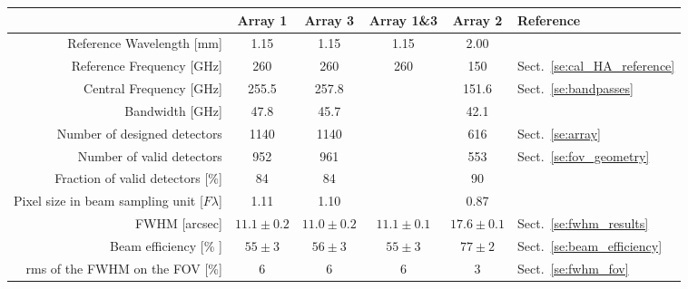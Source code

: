 \begin{table}[h]
\begin{center}    
  \begin{threeparttable}
    \begin{tabular}{|r|c|c|c|c|l|}
      \hline
      & Array 1 & Array 3  & Array 1\&3 & Array 2 & Reference \\
      \hline
      \hline
      Reference Wavelength  [mm]  &  1.15    &  1.15   & 1.15  & 2.00   &   \\
      Reference Frequency  [GHz]  &  260    &  260   & 260  & 150   &  Sect.~\ref{se:cal_HA_reference}  \\
      Central Frequency [GHz]     &  255.5  &  257.8 &      & 151.6 &  Sect.~\ref{se:bandpasses}  \\
      Bandwidth         [GHz]     &  47.8   &  45.7  &      & 42.1  &   \\
      \hline
      Number of designed detectors                   & 1140      &  1140    &    &    616  & Sect.~\ref{se:array}\\
      Number of valid detectors                      &  952      &   961    &    &    553  & Sect.~\ref{se:fov_geometry}\\
      Fraction of valid detectors [$\%$]             &  84       &   84     &    &     90  & \\
      Pixel size in beam sampling unit\tnote{(a)}\hspace{3mm} [$F\lambda$] & 1.11 & 1.10  &  &  0.87 & \\
      \hline
      FWHM\tnote{(b)}\hspace{3mm} [arcsec]    &  $11.1 \pm 0.2$   &  $11.0 \pm 0.2$  &   $11.1 \pm 0.1$  &  $17.6 \pm 0.1$  &  Sect.~\ref{se:fwhm_results}\\
      Beam efficiency\tnote{(c)}\hspace{3mm} [\% ] &  $55 \pm 3$  &  $56 \pm 3$   &  $55 \pm 3$   &  $77 \pm 2$  &  Sect.~\ref{se:beam_efficiency}\\
      rms of the FWHM on the FOV [$\%$]          &    6         &      6        &       6        &      3        & Sect.~\ref{se:fwhm_fov}\\

\end{tabular}
\end{threeparttable}
\end{center}
\end{table}
